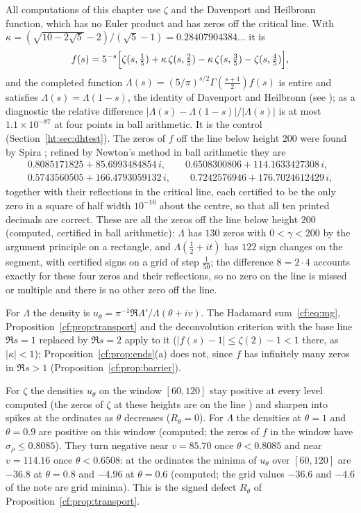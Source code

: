 \begin{resultpar}\label{cf:res:dhzeros}
All computations of this chapter use $\zeta$ and the Davenport and Heilbronn function, which has no Euler product and has zeros off the critical line. With $\kappa=(\sqrt{10-2\sqrt5}-2)/(\sqrt5-1)=0.28407904384\ldots$ it is \cite{DH36,Titchmarsh}
\[
f(s)=5^{-s}\Bigl[\zeta(s,\tfrac15)+\kappa\,\zeta(s,\tfrac25)-\kappa\,\zeta(s,\tfrac35)-\zeta(s,\tfrac45)\Bigr],
\]
and the completed function $\Lambda(s)=(5/\pi)^{s/2}\Gamma(\frac{s+1}2)f(s)$ is entire and satisfies $\Lambda(s)=\Lambda(1-s)$, the identity of Davenport and Heilbronn \cite{DH36} (see \cite{Titchmarsh}); as a diagnostic the relative difference $\lvert\Lambda(s)-\Lambda(1-s)\rvert/\lvert\Lambda(s)\rvert$ is at most $1.1\times10^{-87}$ at four points in ball arithmetic. It is the control (Section~\ref{ht:sec:dhtest}). The zeros of $f$ off the line below height $200$ were found by Spira \cite{Spira94}; refined by Newton's method in ball arithmetic they are
\begin{gather*}
0.8085171825+85.6993484854\,i,\qquad 0.6508300806+114.1633427308\,i,\\
0.5743560505+166.4793059132\,i,\qquad 0.7242576946+176.7024612429\,i,
\end{gather*}
together with their reflections in the critical line, each certified to be the only zero in a square of half width $10^{-16}$ about the centre, so that all ten printed decimals are correct. These are all the zeros off the line below height $200$ (computed, certified in ball arithmetic): $\Lambda$ has $130$ zeros with $0<\gamma<200$ by the argument principle on a rectangle, and $\Lambda(\frac12+it)$ has $122$ sign changes on the segment, with certified signs on a grid of step $\frac1{50}$; the difference $8=2\cdot4$ accounts exactly for these four zeros and their reflections, so no zero on the line is missed or multiple and there is no other zero off the line.
\end{resultpar}

For $\Lambda$ the density is $u_\theta=\pi^{-1}\Re\Lambda'/\Lambda(\theta+iv)$. The Hadamard sum~\eqref{cf:eq:mg}, Proposition~\ref{cf:prop:transport} and the deconvolution criterion with the base line $\Re s=1$ replaced by $\Re s=2$ apply to it ($\lvert f(s)-1\rvert\le\zeta(2)-1<1$ there, as $\lvert\kappa\rvert<1$); Proposition~\ref{cf:prop:ends}(a) does not, since $f$ has infinitely many zeros in $\Re s>1$ \cite{DH36} (Proposition~\ref{cf:prop:barrier}).

For $\zeta$ the densities $u_\theta$ on the window $[60,120]$ stay positive at every level computed (the zeros of $\zeta$ at these heights are on the line \cite{PT21}) and sharpen into spikes at the ordinates as $\theta$ decreases ($R_\theta=0$). For $\Lambda$ the densities at $\theta=1$ and $\theta=0.9$ are positive on this window (computed; the zeros of $f$ in the window have $\sigma_\rho\le0.8085$). They turn negative near $v=85.70$ once $\theta<0.8085$ and near $v=114.16$ once $\theta<0.6508$: at the ordinates the minima of $u_\theta$ over $[60,120]$ are $-36.8$ at $\theta=0.8$ and $-4.96$ at $\theta=0.6$ (computed; the grid values $-36.6$ and $-4.6$ of the note are grid minima). This is the signed defect $R_\theta$ of Proposition~\ref{cf:prop:transport}.

